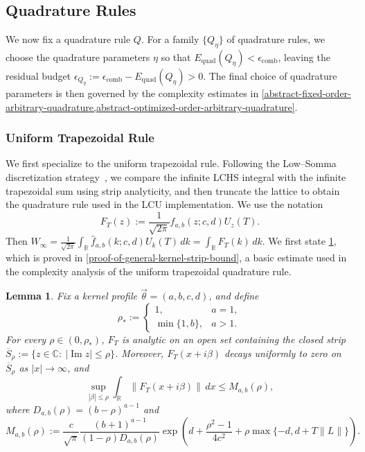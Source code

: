 \documentclass[10pt,reqno]{article}
\numberwithin{equation}{section}
\theoremstyle{plain}
\newtheorem{lem}[thm]{Lemma}
\theoremstyle{definition}
\begin{document}
\subsection{Quadrature Rules}\label{quad-rules} 
We now fix a quadrature rule \(Q\). For a family \(\{Q_\eta\}\) of quadrature rules, we choose the quadrature parameters \(\eta\) so that \(E_{\operatorname{quad}}(Q_\eta)<\epsilon_{\operatorname{comb}}\), leaving the residual budget $\epsilon_{Q_\eta}:=\epsilon_{\operatorname{comb}} - E_{\operatorname{quad}}(Q_\eta)>0$.  The final choice of quadrature parameters is then governed by the complexity estimates in \cref{abstract-fixed-order-arbitrary-quadrature,abstract-optimized-order-arbitrary-quadrature}.

\subsubsection{Uniform Trapezoidal Rule}
\label{trap-rule-subsub}
We first specialize to the uniform trapezoidal rule. Following the Low--Somma discretization strategy~\cite{low2025optimallchs}, we compare the infinite LCHS integral with the infinite trapezoidal sum using strip analyticity, and then truncate the lattice to obtain the quadrature rule used in the LCU implementation. We use the notation
\begin{equation}\label{eq:FT-def}
F_T(z) := \frac{1}{\sqrt{2\pi}}\hat f_{a,b}(z;c,d)U_z(T).
\end{equation}
Then \(W_\infty = \frac{1}{\sqrt{2\pi}}\int_{\mathbb{R}} \hat f_{a,b}(k;c,d)U_k(T)\,dk = \int_{\mathbb{R}} F_T(k)\,dk\). We first state \cref{general-kernel-strip-bound}, which is proved in \cref{proof-of-general-kernel-strip-bound},  a basic estimate used in the complexity analysis of the uniform trapezoidal quadrature rule.

\begin{lem}\label{general-kernel-strip-bound}
Fix a kernel profile \(\vec{\theta}=(a,b,c,d)\), and define
\begin{equation}\label{eq:rho-star-def}
\rho_\ast := \begin{cases} 1, & a=1,\\ \min\{1,b\}, & a>1. \end{cases}
\end{equation}
For every \(\rho\in(0,\rho_\ast)\), \(F_T\) is analytic on an open set containing the closed strip \(\overline S_\rho := \{z\in\mathbb C:\ |\operatorname{Im}z|\le \rho\}\). Moreover, \(F_T(x+i\beta)\) decays uniformly to zero on \(\overline S_\rho\) as \(|x|\to\infty\), and
\begin{equation}\label{eq:strip-L1-bound}
\sup_{|\beta|\le \rho}\int_{\mathbb R}\|F_T(x+i\beta)\|\,dx \le M_{a,b}(\rho),
\end{equation}
where $D_{a,b}(\rho) = (b-\rho)^{a-1}$ and
\begin{equation}\label{eq:Mab-sharp-def}
M_{a,b}(\rho) := \frac{c}{\sqrt{\pi}}\frac{(b+1)^{a-1}}{(1-\rho)D_{a,b}(\rho)}\exp\left(d+\frac{\rho^2-1}{4c^2}+\rho\max\{-d,d+T\|L\|\}\right).
\end{equation}
\end{lem}
\end{document}
